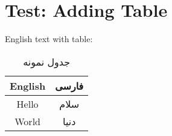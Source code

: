 \documentclass[12pt,a4paper]{article}
\newcommand{\fa}[1]{\textfarsi{#1}}
\newcommand{\en}[1]{\textenglish{#1}}
\begin{document}
\section*{Test: Adding Table}

\en{English text with table:}

\begin{table}[h]
\centering
\begin{tabular}{|c|c|}
\hline
\en{English} & \fa{فارسی} \\
\hline
\en{Hello} & \fa{سلام} \\
\en{World} & \fa{دنیا} \\
\hline
\end{tabular}
\caption{\fa{جدول نمونه}}
\end{table}
\end{document}
